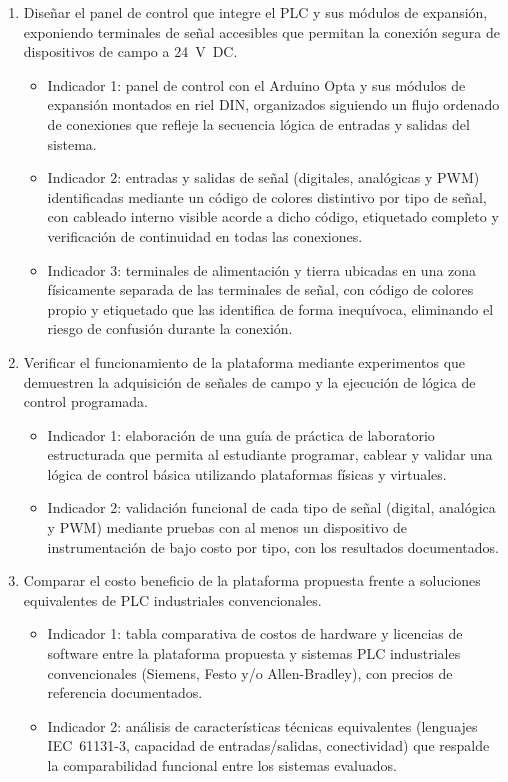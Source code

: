 \documentclass[12pt,a4paper,oneside]{report}
\begin{document}
\begin{enumerate}

    \item Diseñar el panel de control que integre el PLC y sus módulos de expansión, exponiendo terminales de señal accesibles que permitan la conexión segura de dispositivos de campo a 24~V~DC.
    \begin{itemize}
        \item Indicador 1: panel de control con el Arduino Opta y sus módulos de expansión montados en riel DIN, organizados siguiendo un flujo ordenado de conexiones que refleje la secuencia lógica de entradas y salidas del sistema.
        \item Indicador 2: entradas y salidas de señal (digitales, analógicas y PWM) identificadas mediante un código de colores distintivo por tipo de señal, con cableado interno visible acorde a dicho código, etiquetado completo y verificación de continuidad en todas las conexiones.
        \item Indicador 3: terminales de alimentación y tierra ubicadas en una zona físicamente separada de las terminales de señal, con código de colores propio y etiquetado que las identifica de forma inequívoca, eliminando el riesgo de confusión durante la conexión.
    \end{itemize}

    \item Verificar el funcionamiento de la plataforma mediante experimentos que demuestren la adquisición de señales de campo y la ejecución de lógica de control programada.
    \begin{itemize}
        \item Indicador 1: elaboración de una guía de práctica de laboratorio estructurada que permita al estudiante programar, cablear y validar una lógica de control básica utilizando plataformas físicas y virtuales.
        \item Indicador 2: validación funcional de cada tipo de señal (digital, analógica y PWM) mediante pruebas con al menos un dispositivo de instrumentación de bajo costo por tipo, con los resultados documentados.
    \end{itemize}

    \item Comparar el costo beneficio de la plataforma propuesta frente a soluciones equivalentes de PLC industriales convencionales.
    \begin{itemize}
        \item Indicador 1: tabla comparativa de costos de hardware y licencias de software entre la plataforma propuesta y sistemas PLC industriales convencionales (Siemens, Festo y/o Allen-Bradley), con precios de referencia documentados.
        \item Indicador 2: análisis de características técnicas equivalentes (lenguajes IEC~61131-3, capacidad de entradas/salidas, conectividad) que respalde la comparabilidad funcional entre los sistemas evaluados.
    \end{itemize}

\end{enumerate}
\end{document}

